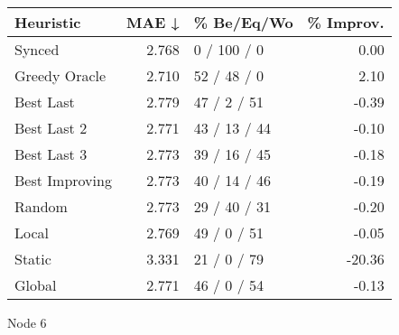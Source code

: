 \begin{tabular}{lrlr}
\toprule
\textbf{Heuristic} & \textbf{MAE ↓} & \textbf{\% Be/Eq/Wo} & \textbf{\% Improv.} \\
\midrule
            Synced &          2.768 &          0 / 100 / 0 &                0.00 \\
     Greedy Oracle &          2.710 &          52 / 48 / 0 &                2.10 \\
         Best Last &          2.779 &          47 / 2 / 51 &               -0.39 \\
       Best Last 2 &          2.771 &         43 / 13 / 44 &               -0.10 \\
       Best Last 3 &          2.773 &         39 / 16 / 45 &               -0.18 \\
    Best Improving &          2.773 &         40 / 14 / 46 &               -0.19 \\
            Random &          2.773 &         29 / 40 / 31 &               -0.20 \\
             Local &          2.769 &          49 / 0 / 51 &               -0.05 \\
            Static &          3.331 &          21 / 0 / 79 &              -20.36 \\
            Global &          2.771 &          46 / 0 / 54 &               -0.13 \\
\bottomrule
\end{tabular}
\caption{Node 6}
\label{tab:hr_iid_lr01_le2_bs2_6}
